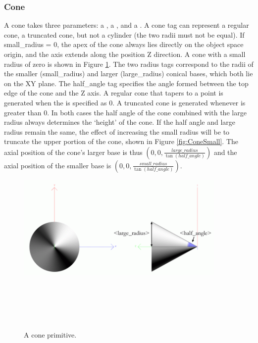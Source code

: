 \subsubsection{Cone}

A cone takes three parameters: a , a , and a .
A cone tag can represent a regular cone, a truncated cone, but not a cylinder (the two radii must not be equal).  If small\_radius = 0, the apex of the cone always lies directly on the object space origin, and the axis extends along the position Z direction.  A cone with a small radius of zero is shown in Figure \ref{fig:ConeIso}.
The two radius tags correspond to the radii of the smaller (small\_radius) and larger (large\_radius) conical bases, which both lie on the XY plane.
The half\_angle tag specifies the angle formed between the top edge of the cone and the Z axis.
A regular cone that tapers to a point is generated when the  is specified as 0.
A truncated cone is generated whenever  is greater than 0.
In both cases the half angle of the cone combined with the large radius always determines the `height' of the cone.
If the half angle and large radius remain the same, the effect of increasing the small radius will be to truncate the upper portion of the cone, shown in Figure \ref{fig:ConeSmall}.
The axial position of the cone's larger base is thus $(0, 0, \frac{large\_radius}{\tan (half\_angle)})$
and the axial position of the smaller base is $(0, 0, \frac{small\_radius}{\tan (half\_angle)})$.

\begin{figure}[htb]
 \begin{center}
   \includegraphics[width=4in]{pics/coneiso.png}
 \end{center}           
        \hspace*{2in}   \\
        \hspace*{2.2in} \\
        \hspace*{2.2in} \\
        \hspace*{2.2in} \\
  \hspace*{2in}       
        \caption[A cone primitive]{A cone primitive.}
        \label{fig:ConeIso}
\end{figure}

